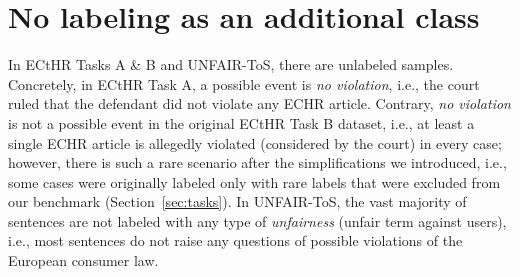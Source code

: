 \documentclass[11pt]{article}
\newcommand{\macrof}{-\xspace}
\begin{document}
\begin{table*}[h]
    \centering
    \vspace{-1mm}
    \caption{Development \macrof results for all examined models across all LexGLUE tasks. We report the mean and standard deviation () for the three seeds with the best development scores per model. In starred datasets, we use the hierarchical variant of each model, except for Longformer and BigBird, as discussed in Section~\ref{sec:baselines}.}
    \label{tab:leaderboard_val_macro}
    \vspace{-4mm}
\end{table*}

\section{No labeling as an additional class}
\label{sec:label_zero}

In ECtHR Tasks A \& B and UNFAIR-ToS, there are unlabeled samples. Concretely, in ECtHR Task A, a possible event is \emph{no violation}, i.e., the court ruled that the defendant did not violate any ECHR article. Contrary, \emph{no violation} is not a possible event in the original ECtHR Task B dataset, i.e., at least a single ECHR article is allegedly violated  (considered by the court) in every case; however, there is such a rare scenario after the simplifications we introduced, i.e., some cases were originally labeled only with rare labels that were excluded from our benchmark (Section~\ref{sec:tasks}). In UNFAIR-ToS, the vast majority of sentences are not labeled with any type of \emph{unfairness} (unfair term against users), i.e., most sentences do not raise any questions of possible violations of the European consumer law. 
\end{document}
